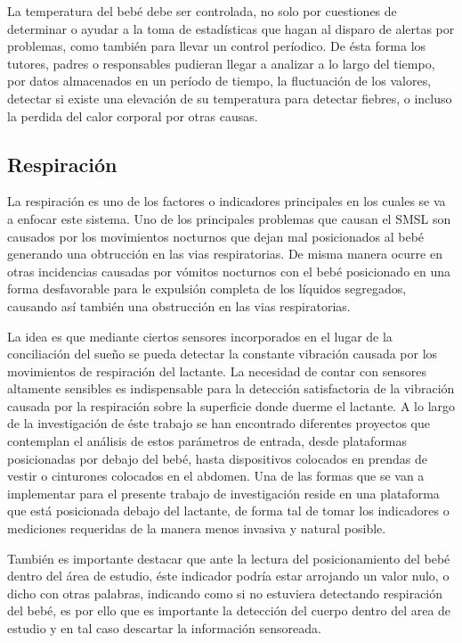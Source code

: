 \documentclass{IEEEtran}
\begin{document}
		La temperatura del bebé debe ser controlada, no solo por cuestiones de determinar o ayudar a la toma de estadísticas que hagan al disparo de alertas por problemas, como también para llevar un control períodico. De ésta forma los tutores, padres o responsables pudieran llegar a analizar a lo largo del tiempo, por datos almacenados en un período de tiempo, la fluctuación de los valores, detectar si existe una elevación de su temperatura para detectar fiebres, o incluso la perdida del calor corporal por otras causas.

		\subsection{Respiración}

		La respiración es uno de los factores o indicadores principales en los cuales se va a enfocar este sistema. Uno de los principales problemas que causan el SMSL son causados por los movimientos nocturnos que dejan mal posicionados al bebé generando una obtrucción en las vias respiratorias. De misma manera ocurre en otras incidencias causadas por vómitos nocturnos con el bebé posicionado en una forma desfavorable para le expulsión completa de los líquidos segregados, causando así también una obstrucción en las vias respiratorias.

		La idea es que mediante ciertos sensores incorporados en el lugar de la conciliación del sueño se pueda detectar la constante vibración causada por los movimientos de respiración del lactante. La necesidad de contar con sensores altamente sensibles es indispensable para la detección satisfactoria de la vibración causada por la respiración sobre la superficie donde duerme el lactante. A lo largo de la investigación de éste trabajo se han encontrado diferentes proyectos que contemplan el análisis de estos parámetros de entrada, desde plataformas posicionadas por debajo del bebé, hasta dispositivos colocados en prendas de vestir o cinturones colocados en el abdomen. Una de las formas que se van a implementar para el presente trabajo de investigación reside en una plataforma que está posicionada debajo del lactante, de forma tal de tomar los indicadores o mediciones requeridas de la manera menos invasiva y natural posible.

		También es importante destacar que ante la lectura del posicionamiento del bebé dentro del área de estudio, éste indicador podría estar arrojando un valor nulo, o dicho con otras palabras, indicando como si no estuviera detectando respiración del bebé, es por ello que es importante la detección del cuerpo dentro del area de estudio y en tal caso descartar la información sensoreada.
	
\end{document}

